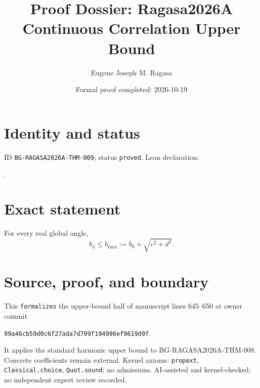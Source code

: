 \documentclass[11pt]{article}
\title{Proof Dossier: Ragasa2026A Continuous Correlation Upper Bound}\author{Eugene Joseph M. Ragasa}\date{Formal proof completed: 2026-10-19}
\begin{document}
\maketitle
\section{Identity and status}
ID \texttt{BG-RAGASA2026A-THM-009}; status \texttt{proved}. Lean declaration:
\par{}.
\section{Exact statement}
For every real global angle,
\[b_\phi\le b_{\max}:=b_0+\sqrt{c^2+d^2}.\]
\section{Source, proof, and boundary}
This \texttt{formalizes} the upper-bound half of manuscript lines 645--650 at owner commit
\begin{center}\small\texttt{99a46cb59d0c6f27ada7d709f194996ef9619d9f}.\end{center}
It applies the standard harmonic
upper bound to BG-RAGASA2026A-THM-008. Concrete coefficients remain external.
Kernel axioms: \texttt{propext}, \texttt{Classical.choice}, \texttt{Quot.sound}; no
admissions. AI-assisted and kernel-checked; no independent expert review recorded.
\end{document}
